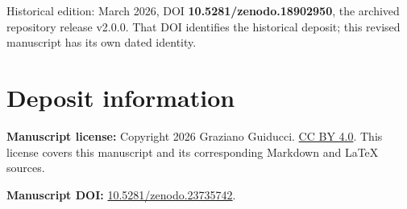 \documentclass[10pt,a4paper]{article}
\begin{document}
Historical edition: March 2026, DOI \textbf{10.5281/zenodo.18902950}, the archived repository release v2.0.0. That DOI identifies the historical deposit; this revised manuscript has its own dated identity.
\par

\section*{Deposit information}

\textbf{Manuscript license:} Copyright 2026 Graziano Guiducci. \href{https://creativecommons.org/licenses/by/4.0/}{CC BY 4.0}. This license covers this manuscript and its corresponding Markdown and LaTeX sources.
\par

\textbf{Manuscript DOI:} \href{https://doi.org/10.5281/zenodo.23735742}{10.5281/zenodo.23735742}.
\par
\end{document}

